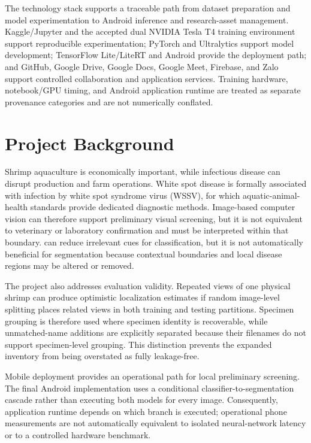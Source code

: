 \documentclass[12pt,a4paper]{report}
\newenvironment{revisionblock}{\begin{snugshade}\noindent}{\end{snugshade}}
\begin{document}
\begin{revisionblock}
The technology stack supports a traceable path from dataset preparation and model experimentation to Android inference and research-asset management. Kaggle/Jupyter and the accepted dual NVIDIA Tesla T4 training environment support reproducible experimentation; PyTorch and Ultralytics support model development; TensorFlow Lite/LiteRT and Android provide the deployment path; and GitHub, Google Drive, Google Docs, Google Meet, Firebase, and Zalo support controlled collaboration and application services. Training hardware, notebook/GPU timing, and Android application runtime are treated as separate provenance categories and are not numerically conflated.
\end{revisionblock}
\section{\texorpdfstring{\colorbox{RevisionYellow}{Project Background}}{Project Background}}
\begin{revisionblock}
Shrimp aquaculture is economically important, while infectious disease can disrupt production and farm operations. White spot disease is formally associated with infection by white spot syndrome virus (WSSV), for which aquatic-animal-health standards provide dedicated diagnostic methods. Image-based computer vision can therefore support preliminary visual screening, but it is not equivalent to veterinary or laboratory confirmation and must be interpreted within that boundary. can reduce irrelevant cues for classification, but it is not automatically beneficial for segmentation because contextual boundaries and local disease regions may be altered or removed.
\end{revisionblock}
\begin{revisionblock}
The project also addresses evaluation validity. Repeated views of one physical shrimp can produce optimistic localization estimates if random image-level splitting places related views in both training and testing partitions. Specimen grouping is therefore used where specimen identity is recoverable, while unmatched-name additions are explicitly separated because their filenames do not support specimen-level grouping. This distinction prevents the expanded inventory from being overstated as fully leakage-free.
\end{revisionblock}
\begin{revisionblock}
Mobile deployment provides an operational path for local preliminary screening. The final Android implementation uses a conditional classifier-to-segmentation cascade rather than executing both models for every image. Consequently, application runtime depends on which branch is executed; operational phone measurements are not automatically equivalent to isolated neural-network latency or to a controlled hardware benchmark.
\end{revisionblock}
\end{document}
